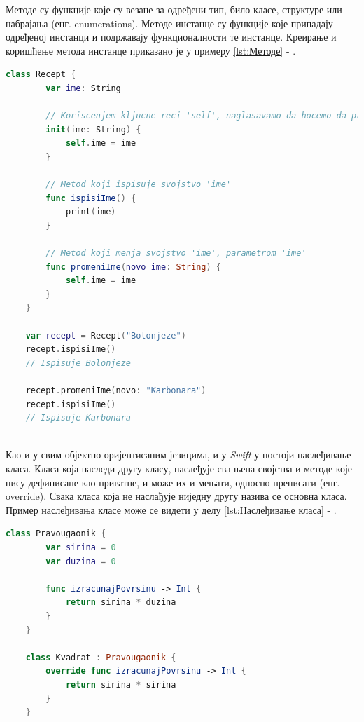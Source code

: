 \documentclass[12pt,oneside]{memoir}
\begin{document}

\indent Методе су функције које су везане за одређени тип, било класе, структуре или набрајања (енг. enumerations). Методе инстанце су функције које припадају одређеној инстанци и подржавају функционалности те инстанце. Креирање и коришћење метода инстанце приказано је у примеру \ref{lst:Методе} - .

\begin{lstlisting}[caption=\textit{{Методе}}, label={lst:Методе}, language=Swift, frame=single]
    class Recept {
        var ime: String
        
        // Koriscenjem kljucne reci 'self', naglasavamo da hocemo da pristupimo svojstvu klase
        init(ime: String) {
            self.ime = ime
        }
        
        // Metod koji ispisuje svojstvo 'ime'
        func ispisiIme() {
            print(ime)
        }
        
        // Metod koji menja svojstvo 'ime', parametrom 'ime'
        func promeniIme(novo ime: String) {
            self.ime = ime
        }
    }
    
    var recept = Recept("Bolonjeze")
    recept.ispisiIme()
    // Ispisuje Bolonjeze
    
    recept.promeniIme(novo: "Karbonara")
    recept.ispisiIme()
    // Ispisuje Karbonara
    
\end{lstlisting}

\indent Као и у свим објектно оријентисаним језицима, и у \textit{Swift}-у постоји наслеђивање класа. Класа која наследи другу класу, наслеђује сва њена својства и методе које нису дефинисане као приватне, и може их и мењати, односно преписати (енг. override). Свака класа која не наслађује ниједну другу назива се основна класа. Пример наслеђивања класе може се видети у делу \ref{lst:Наслеђивање класа} - .

\begin{lstlisting}[caption=\textit{{Наслеђивање класа}}, label={lst:Наслеђивање класа}, language=Swift, frame=single]
    class Pravougaonik {
        var sirina = 0
        var duzina = 0
        
        func izracunajPovrsinu -> Int {
            return sirina * duzina
        }
    }
    
    class Kvadrat : Pravougaonik {
        override func izracunajPovrsinu -> Int {
            return sirina * sirina
        }
    }
\end{lstlisting}
\end{document}
